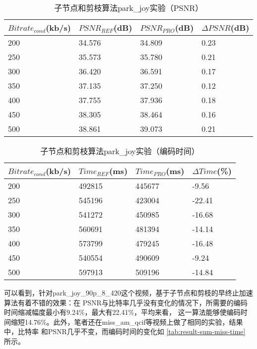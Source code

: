\begin{table}[H]
  \centering
    \caption{子节点和剪枝算法park\_joy实验（PSNR）}
    \label{tab:result-sum-park-psnr}
    \begin{tabularx}{\linewidth}{XXXX}
      \toprule[1.5pt]
      $Bitrate_{cond}$(kb/s) & $PSNR_{REF}$(dB) & $PSNR_{PRO}$(dB) & $\Delta PSNR$(dB) \\
      \midrule[1pt]
      200 & 34.576 & 34.809 & 0.23  \\
      250 & 35.573 & 35.780 & 0.21 \\
      300 & 36.420 & 36.591 & 0.17  \\
      350 & 37.135 & 37.250 & 0.12 \\
      400 & 37.755 & 37.936 & 0.18  \\
      450 & 38.305 & 38.464 & 0.16 \\
      500 & 38.861 & 39.073 & 0.21  \\
      \bottomrule[1.5pt]
    \end{tabularx}
\end{table}

\begin{table}[H]
  \centering
    \caption{子节点和剪枝算法park\_joy实验（编码时间）}
    \label{tab:result-sum-park-time}
    \begin{tabularx}{\linewidth}{XXXX}
      \toprule[1.5pt]
      $Bitrate_{cond}$(kb/s) & $Time_{REF}$(ms) & $Time_{PRO}$(ms) & $\Delta Time$(\%) \\
      \midrule[1pt]
      200 & 492815 & 445677 & -9.56  \\
      250 & 545196 & 423004 & -22.41 \\
      300 & 541272 & 450985 & -16.68  \\
      350 & 560691 & 481394 & -14.14 \\
      400 & 573799 & 479245 & -16.48  \\
      450 & 540554 & 490609 & -9.24 \\
      500 & 597913 & 509196 & -14.84  \\
      \bottomrule[1.5pt]
    \end{tabularx}
\end{table}


可以看到，针对park\_joy\_90p\_8\_420这个视频，基于子节点和剪枝的早终止加速算法有着不错的效果：在
PSNR与比特率几乎没有变化的情况下，所需要的编码时间缩减幅度最小有9.24\%，最大有22.41\%，平均来看，
这一算法能够使编码时间缩短14.76\%。此外，笔者还在miss\_am\_qcif等视频上做了相同的实验，结果中，比特率
和PSNR几乎不变，而编码时间的变化如 \ref{tab:result-sum-miss-time} 所示。

